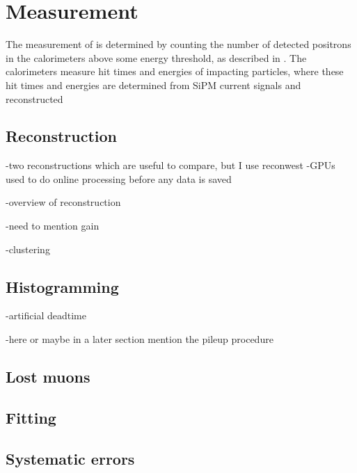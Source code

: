 
\chapter{\texorpdfstring{\wa}{wa} Measurement}
\label{chapter:SpinPrecessionMeasurement}
\thispagestyle{myheadings}


The measurement of \wa is determined by counting the number of detected positrons in the calorimeters above some energy threshold, as described in . The calorimeters measure hit times and energies of impacting particles, where these hit times and energies are determined from SiPM current signals and reconstructed



\section{Reconstruction}
\label{sec:ReconWest}



-two reconstructions which are useful to compare, but I use reconwest
-GPUs used to do online processing before any data is saved





-overview of reconstruction

-need to mention gain


-clustering


\cite{AFThesis}



\section{Histogramming}
\label{sec:Histogramming}


-artificial deadtime

-here or maybe in a later section mention the pileup procedure


\section{Lost muons}
\label{sec:lostmuons}

\section{Fitting}
\label{sec:Fitting}

\section{Systematic errors}
\label{sec:Systematic Errors}



\cleardoublepage
